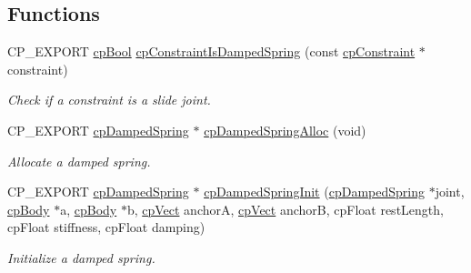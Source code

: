 \subsection*{Functions}
\begin{DoxyCompactItemize}
\item 
\mbox{\label{group__cpDampedSpring_gad543406dd5555ccca55f3eb254a60e58}} 
C\+P\+\_\+\+E\+X\+P\+O\+RT \hyperlink{group__basicTypes_gabc5e752c48f3449ca26ef413ecbd647e}{cp\+Bool} \hyperlink{group__cpDampedSpring_gad543406dd5555ccca55f3eb254a60e58}{cp\+Constraint\+Is\+Damped\+Spring} (const \hyperlink{structcpConstraint}{cp\+Constraint} $\ast$constraint)
\begin{DoxyCompactList}\small\item\em Check if a constraint is a slide joint. \end{DoxyCompactList}\item 
\mbox{\label{group__cpDampedSpring_ga40b4e81e763fcb50f4cef6ca1d35e6c2}} 
C\+P\+\_\+\+E\+X\+P\+O\+RT \hyperlink{structcpDampedSpring}{cp\+Damped\+Spring} $\ast$ \hyperlink{group__cpDampedSpring_ga40b4e81e763fcb50f4cef6ca1d35e6c2}{cp\+Damped\+Spring\+Alloc} (void)
\begin{DoxyCompactList}\small\item\em Allocate a damped spring. \end{DoxyCompactList}\item 
\mbox{\label{group__cpDampedSpring_ga62d5e6341d3741ff32adb499f67fa65b}} 
C\+P\+\_\+\+E\+X\+P\+O\+RT \hyperlink{structcpDampedSpring}{cp\+Damped\+Spring} $\ast$ \hyperlink{group__cpDampedSpring_ga62d5e6341d3741ff32adb499f67fa65b}{cp\+Damped\+Spring\+Init} (\hyperlink{structcpDampedSpring}{cp\+Damped\+Spring} $\ast$joint, \hyperlink{structcpBody}{cp\+Body} $\ast$a, \hyperlink{structcpBody}{cp\+Body} $\ast$b, \hyperlink{structcpVect}{cp\+Vect} anchorA, \hyperlink{structcpVect}{cp\+Vect} anchorB, cp\+Float rest\+Length, cp\+Float stiffness, cp\+Float damping)
\begin{DoxyCompactList}\small\item\em Initialize a damped spring. \end{DoxyCompactList}\item 
\mbox{\label{group__cpDampedSpring_gaa1493ee0a6b5a8fbb0cbae5d97da07f8}} 

\end{DoxyCompactItemize}
